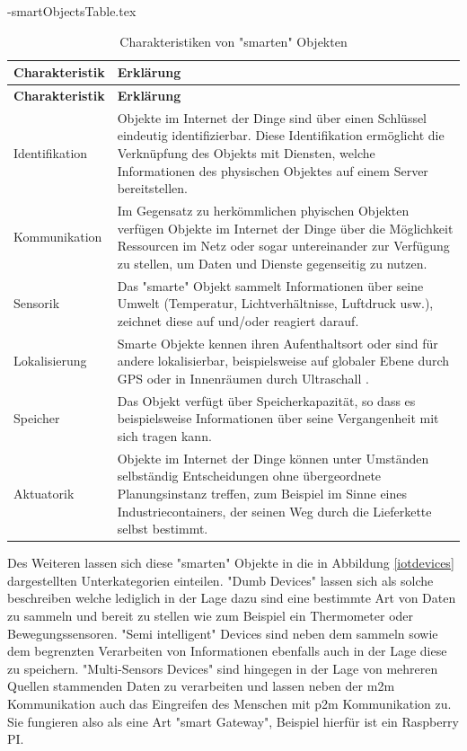 \documentclass[a4paper, 12pt, twoside, headsepline=true]{scrartcl} %
\begin{document}
\begin{filecontents}{\jobname-smartObjectsTable.tex}
	\begin{longtable}{P{4.5cm}|X}
		\caption{Charakteristiken von "smarten" Objekten\cite{iotwiki}}\\
		\label{table:smartObjectsCharacteristics}
		\textbf{Charakteristik} & \textbf{Erklärung}   \\ \hline
		\endfirsthead %
		\textbf{Charakteristik} & \textbf{Erklärung}  \\ \hline
		\endhead
		Identifikation & Objekte im Internet der Dinge sind über einen Schlüssel eindeutig identifizierbar. Diese Identifikation ermöglicht die Verknüpfung des Objekts mit Diensten, welche Informationen des physischen Objektes auf einem Server bereitstellen. \\ \hline
		Kommunikation & Im Gegensatz zu herkömmlichen phyischen Objekten verfügen Objekte im Internet der Dinge über die Möglichkeit Ressourcen im Netz oder sogar untereinander zur Verfügung zu stellen, um Daten und Dienste gegenseitig zu nutzen.\\ \hline
		Sensorik & Das "smarte" Objekt sammelt Informationen über seine Umwelt (Temperatur, Lichtverhältnisse, Luftdruck usw.), zeichnet diese auf und/oder reagiert darauf.\\ \hline
		Lokalisierung & Smarte Objekte kennen ihren Aufenthaltsort oder sind für andere lokalisierbar, beispielsweise auf globaler Ebene durch GPS oder in Innenräumen durch Ultraschall .\\ \hline
		Speicher & Das Objekt verfügt über Speicherkapazität, so dass es beispielsweise Informationen über seine Vergangenheit mit sich tragen kann.\\ \hline
		Aktuatorik & Objekte im Internet der Dinge können unter Umständen selbständig Entscheidungen ohne übergeordnete Planungsinstanz treffen, zum Beispiel im Sinne eines Industriecontainers, der seinen Weg durch die Lieferkette selbst bestimmt.\\ \hline
	\end{longtable}
\end{filecontents}
Des Weiteren lassen sich diese "smarten" Objekte in die in Abbildung \ref{iotdevices} dargestellten Unterkategorien einteilen. "Dumb Devices" lassen sich als solche beschreiben welche lediglich in der Lage dazu sind eine bestimmte Art von Daten zu sammeln und bereit zu stellen wie zum Beispiel ein Thermometer oder Bewegungssensoren. "Semi intelligent" Devices sind neben dem sammeln sowie dem begrenzten Verarbeiten von Informationen ebenfalls auch in der Lage diese zu speichern. "Multi-Sensors Devices" sind hingegen in der Lage von mehreren Quellen stammenden Daten zu verarbeiten und lassen neben der \ac{m2m} Kommunikation auch das Eingreifen des Menschen mit \ac{p2m} Kommunikation zu. Sie fungieren also als eine Art "smart Gateway", Beispiel hierfür ist ein Raspberry PI. \\
\end{document}
